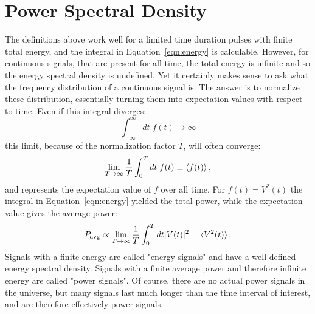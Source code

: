 \documentclass[12pt]{article}
\begin{document}
\section{Power Spectral Density}

The definitions above work well for a limited time duration pulses with finite total energy, and the integral in Equation~\ref{eqn:energy} is calculable.  However, for continuous signals, that are present for all time, the total energy is infinite and so the energy spectral density is undefined.  Yet it certainly makes sense to ask what the frequency distribution of a continuous signal is.  The answer is to normalize these distribution, essentially turning them into expectation values with respect to time.  Even if this integral diverges:
\begin{displaymath}
\int_{-\infty}^{\infty} dt \; f(t) \to \infty
\end{displaymath}
this limit, because of the normalization factor $T$, will often converge:
\begin{displaymath}
\lim_{T \to \infty } \frac{1}{T} \int_{0}^{T} dt \; f(t) \equiv \braket{f(t)},
\end{displaymath}
and represents the expectation value of $f$ over all time.  For $f(t) = V^2(t)$ the integral in Equation~\ref{eqn:energy} yielded the total power, while the expectation value gives the average power: 
\begin{equation}
P_{\rm avg} \propto \lim_{T\to \infty} \frac{1}{T} \int_0^T dt |V(t)|^2 \label{eqn:power} = \braket{V^2(t)}.
\end{equation}
Signals with a finite energy are called "energy signals" and have a well-defined energy spectral density.
Signals with a finite average power and therefore infinite energy are called "power signals".  Of course, there are no actual power signals in the universe, but many signals last much longer than the time interval of interest, and are therefore effectively power signals.
\end{document}
